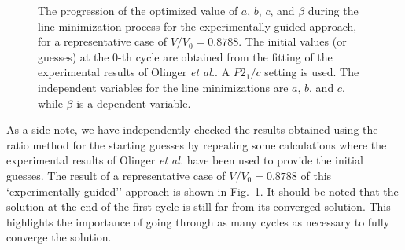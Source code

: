 \commentoutA{\documentclass[prl,aps,twocolumn,twocolumngrid,superbib]{revtex4}}
\begin{document}
\begin{figure}
\caption{
The progression of the optimized value of $a$, $b$, $c$, and $\beta$
during the line minimization process for the 
experimentally guided approach, for a representative case of $V/V_0 = 0.8788$. The initial values (or guesses) 
at the $0$-th cycle are
obtained from the fitting of the experimental results of Olinger {\it et al.}\cite{BOlinger78}.
A $P2_1/c$ setting is used. The independent variables for the line minimizations are $a$, $b$, and $c$,
while $\beta$ is a dependent variable.
}
\label{fig:guided}
\end{figure}

As a side note, we have independently checked the results obtained
using the ratio method for the starting guesses by repeating some
calculations where the experimental results of Olinger {\it et al.}
have been used to provide the initial guesses.  The result of a
representative case of $V/V_0 = 0.8788$ of this `experimentally
guided'' approach is shown in Fig.~\ref{fig:guided}.  It should be
noted that the solution at the end of the first cycle is still far
from its converged solution. This highlights the importance of going
through as many cycles as necessary to fully converge the solution.
\end{document}
